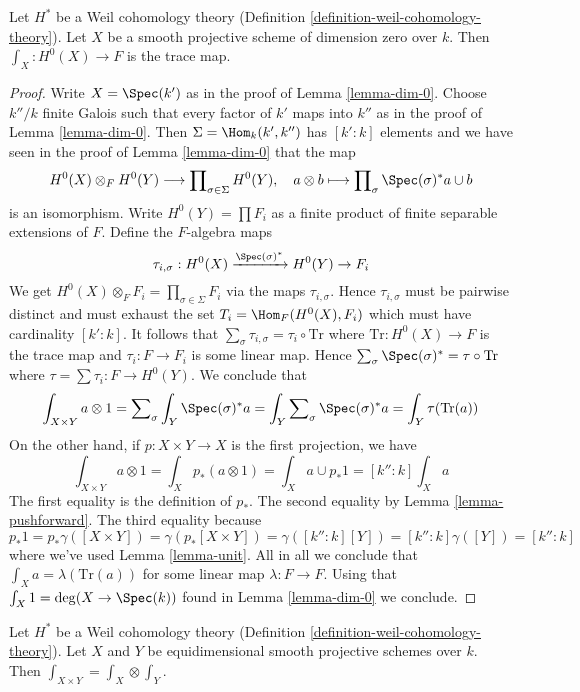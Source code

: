 \begin{lemma}
\label{lemma-dim-0-trace}
Let $H^*$ be a Weil cohomology theory
(Definition \ref{definition-weil-cohomology-theory}).
Let $X$ be a smooth projective scheme of dimension zero over $k$.
Then $\int_X : H^0(X) \to F$ is the trace map.
\end{lemma}

\begin{proof}
Write $X = \Spec(k')$ as in the proof of Lemma \ref{lemma-dim-0}.
Choose $k''/k$ finite Galois such that every factor of $k'$
maps into $k''$ as in the proof of Lemma \ref{lemma-dim-0}.
Then $\Sigma = \Hom_k(k', k'')$ has $[k' : k]$ elements and
we have seen in the proof of Lemma \ref{lemma-dim-0} that the map
$$
H^0(X) \otimes_F H^0(Y) \longrightarrow
\prod\nolimits_{\sigma \in \Sigma} H^0(Y),\quad
a \otimes b \longmapsto \prod\nolimits_\sigma \Spec(\sigma)^*a \cup b
$$
is an isomorphism. Write $H^0(Y) = \prod F_i$ as a finite product of
finite separable extensions of $F$. Define the $F$-algebra maps
$$
\tau_{i, \sigma} :
H^0(X) \xrightarrow{\Spec(\sigma)^*} H^0(Y) \to F_i
$$
We get $H^0(X) \otimes_F F_i = \prod\nolimits_{\sigma \in \Sigma} F_i$
via the maps $\tau_{i, \sigma}$. Hence $\tau_{i, \sigma}$
must be pairwise distinct and must exhaust the set
$T_i = \Hom_F(H^0(X), F_i)$ which must have cardinality $[k' : k]$.
It follows that $\sum_\sigma \tau_{i, \sigma} = \tau_i \circ \text{Tr}$
where $\text{Tr} : H^0(X) \to F$ is the trace map and
$\tau_i : F \to F_i$ is some linear map. Hence
$\sum_\sigma \Spec(\sigma)^* = \tau \circ \text{Tr}$ where
$\tau  = \sum \tau_i : F \to H^0(Y)$.
We conclude that
$$
\int_{X \times Y} a \otimes 1 =
\sum\nolimits_\sigma \int_Y \Spec(\sigma)^*a =
\int_Y \sum\nolimits_\sigma \Spec(\sigma)^*a =
\int_Y \tau(\text{Tr}(a))
$$
On the other hand, if $p : X \times Y \to X$ is the first projection,
we have
$$
\int_{X \times Y} a \otimes 1 = \int_X p_*(a \otimes 1) =
\int_X a \cup p_*1 = [k'' : k] \int_X a
$$
The first equality is the definition of $p_*$. The second equality
by Lemma \ref{lemma-pushforward}. The third equality because
$$
p_*1 = p_*\gamma([X \times Y]) =
\gamma(p_*[X \times Y]) = \gamma([k'' : k][Y]) =
[k'' : k] \gamma([Y]) = [k'' : k]
$$
where we've used Lemma \ref{lemma-unit}.
All in all we conclude that $\int_X a = \lambda(\text{Tr}(a))$
for some linear map $\lambda : F \to F$.
Using that $\int_X 1 = \deg(X \to \Spec(k))$ found in Lemma \ref{lemma-dim-0}
we conclude.
\end{proof}

\begin{lemma}
\label{lemma-trace-product}
Let $H^*$ be a Weil cohomology theory
(Definition \ref{definition-weil-cohomology-theory}).
Let $X$ and $Y$ be equidimensional smooth projective schemes over $k$.
Then $\int_{X \times Y} = \int_X \otimes \int_Y$.
\end{lemma}

